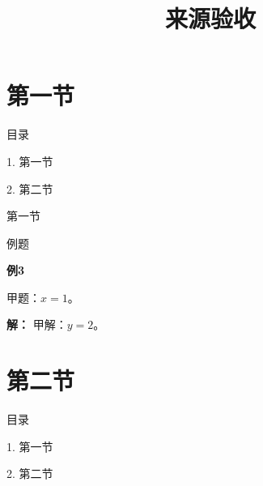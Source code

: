 \documentclass[aspectratio=169,10pt,fontset=fandol]{ctexbeamer}
\title{来源验收}
\begin{document}
\section{第一节}
\begin{frame}[t,fragile]{目录}
\normalsize
{\color{blue}\normalsize 1. 第一节\par}\vspace{0.3em}
{\color{gray!40}\normalsize 2. 第二节\par}\vspace{0.3em}
\end{frame}
\begin{frame}[t,fragile]{第一节}
\normalsize
\begin{block}{例题}
{\normalsize
\textbf{例3}\par
甲题：$x=1$。
}
\end{block}
\pause
{\normalsize
\textbf{解：}
甲解：$y=2$。
}
\end{frame}
\section{第二节}
\begin{frame}[t,fragile]{目录}
\normalsize
{\color{black}\normalsize 1. 第一节\par}\vspace{0.3em}
{\color{blue}\normalsize 2. 第二节\par}\vspace{0.3em}
\end{frame}
\end{document}
